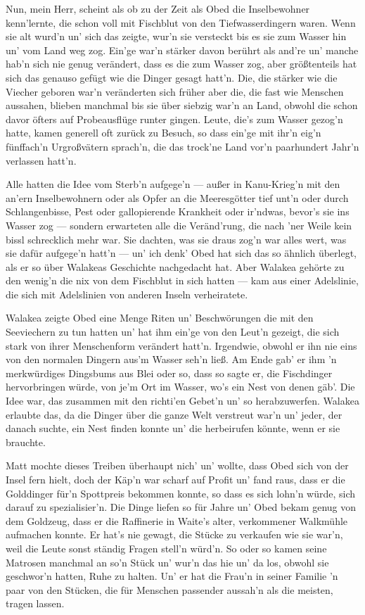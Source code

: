 Nun, mein Herr, scheint als ob zu der Zeit als Obed die Inselbewohner kenn'lernte, die schon voll mit Fischblut von den Tiefwasserdingern waren. Wenn sie alt wurd'n un' sich das zeigte, wur'n sie versteckt bis es sie zum Wasser hin un' vom Land weg zog. Ein'ge war'n stärker davon berührt als and're un' manche hab'n sich nie genug verändert, dass es die zum Wasser zog, aber größtenteils hat sich das genauso gefügt wie die Dinger gesagt hatt'n. Die, die stärker wie die Viecher geboren war'n veränderten sich früher aber die, die fast wie Menschen aussahen, blieben manchmal bis sie über siebzig war'n an Land, obwohl die schon davor öfters auf Probeausflüge runter gingen. Leute, die's zum Wasser gezog'n hatte, kamen generell oft zurück zu Besuch, so dass ein'ge mit ihr'n eig'n fünffach'n Urgroßvätern sprach'n, die das trock'ne Land vor'n paarhundert Jahr'n verlassen hatt'n.

Alle hatten die Idee vom Sterb'n aufgege'n --- außer in Kanu-Krieg'n mit den an'ern Inselbewohnern oder als Opfer an die Meeresgötter tief unt'n oder durch Schlangenbisse, Pest oder gallopierende Krankheit oder ir'ndwas, bevor's sie ins Wasser zog --- sondern erwarteten alle die Veränd'rung, die nach 'ner Weile kein bissl schrecklich mehr war. Sie dachten, was sie draus zog'n war alles wert, was sie dafür aufgege'n hatt'n --- un' ich denk' Obed hat sich das so ähnlich überlegt, als er so über Walakeas Geschichte nachgedacht hat. Aber Walakea gehörte zu den wenig'n die nix von dem Fischblut in sich hatten --- kam aus einer Adelslinie, die sich mit Adelslinien von anderen Inseln verheiratete.

Walakea zeigte Obed eine Menge Riten un' Beschwörungen die mit den Seeviechern zu tun hatten un' hat ihm ein'ge von den Leut'n gezeigt, die sich stark von ihrer Menschenform verändert hatt'n. Irgendwie, obwohl er ihn nie eins von den normalen Dingern aus'm Wasser seh'n ließ. Am Ende gab' er ihm 'n merkwürdiges Dingsbums aus Blei oder so, dass so sagte er, die Fischdinger hervorbringen würde, von je'm Ort im Wasser, wo's ein Nest von denen gäb'. Die Idee war, das zusammen mit den richti'en Gebet'n un' so herabzuwerfen. Walakea erlaubte das, da die Dinger über die ganze Welt verstreut war'n un' jeder, der danach suchte, ein Nest finden konnte un' die herbeirufen könnte, wenn er sie brauchte.

Matt mochte dieses Treiben überhaupt nich' un' wollte, dass Obed sich von der Insel fern hielt, doch der Käp'n war scharf auf Profit un' fand raus, dass er die Golddinger für'n Spottpreis bekommen konnte, so dass es sich lohn'n würde, sich darauf zu spezialisier'n. Die Dinge liefen so für Jahre un' Obed bekam genug von dem Goldzeug, dass er die Raffinerie in Waite's alter, verkommener Walkmühle aufmachen konnte. Er hat's nie gewagt, die Stücke zu verkaufen wie sie war'n, weil die Leute sonst ständig Fragen stell'n würd'n. So oder so kamen seine Matrosen manchmal an so'n Stück un' wur'n das hie un' da los, obwohl sie geschwor'n hatten, Ruhe zu halten. Un' er hat die Frau'n in seiner Familie 'n paar von den Stücken, die für  Menschen passender aussah'n als die meisten, tragen lassen.


